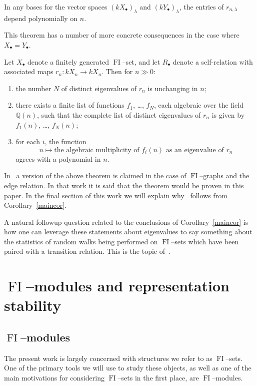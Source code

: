 \documentclass[ALCO,ThmDefs,Unicode,epreuves]{cedram}
\DeclareMathOperator{\FI}{FI}
\newcommand{\Q}{\mathbb{Q}}
\newcommand{\dt}{\bullet}
\begin{document}
\begin{thmab}\label{relationthm}
In any bases for the vector spaces $(k X_{\dt})_{\lambda}$ and $(k Y_{\dt})_{\lambda}$, the entries of $r_{n,\lambda}$ depend polynomially on $n$.
\end{thmab}

This theorem has a number of more concrete consequences in the case where $X_{\dt} = Y_{\dt}$.
 
\begin{corab}\label{maincor}
Let $X_\dt$ denote a finitely generated $\FI$--set, and let $R_\dt$ denote a self-relation with associated maps $r_n:k X_n \rightarrow k X_n$. Then for $n \gg 0$:
\begin{enumerate}
\item\label{coro1.6_1} the number $N$ of distinct eigenvalues of $r_n$ is unchanging in $n$;
\item\label{coro1.6_2} there exists a finite list of functions $f_1$, \dots, $f_N$, each algebraic over the field $\Q(n)$, such that the complete list of distinct eigenvalues of $r_n$ is given by $f_1(n)$, \dots, $f_N(n)$;
\item\label{coro1.6_3} for each $i$, the function
\[
n \mapsto \text{the algebraic multiplicity of $f_i(n)$ as an eigenvalue of $r_n$}
\]
agrees with a polynomial in $n$.
\end{enumerate}
\end{corab}

\begin{remark}
In~\cite[Theorem~H]{RW} a version of the above theorem is claimed in the case of $\FI$--graphs and the edge relation. In that work it is said that the theorem would be proven in this paper. In the final section of this work we will explain why~\cite[Theorem~H]{RW} follows from Corollary~\ref{maincor}.

A natural followup question related to the conclusions of Corollary~\ref{maincor} is how one can leverage these statements about eigenvalues to say something about the statistics of random walks being performed on $\FI$--sets which have been paired with a transition relation. This is the topic of~\cite{RW2}.
\end{remark}


\section{\texorpdfstring{$\FI$}{FI}--modules and representation stability}

\subsection{\texorpdfstring{$\FI$}{FI}--modules}
The present work is largely concerned with structures we refer to as $\FI$--sets. One of the primary tools we will use to study these objects, as well as one of the main motivations for considering $\FI$--sets in the first place, are $\FI$--modules.
\end{document}
